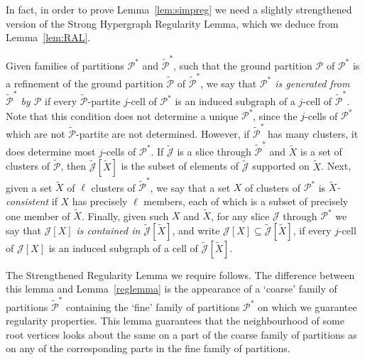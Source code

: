 \documentclass[12pt,a4paper]{amsart}
\newcommand{\cJ}{\mathcal{J}}
\newcommand{\Part}{\mathcal{P}}
\begin{document}
In fact, in order to prove Lemma~\ref{lem:simpreg} we need a slightly
strengthened version of the Strong Hypergraph Regularity Lemma, which we deduce from Lemma~\ref{lem:RAL}. 

Given families of partitions $\Part^*$ and $\tilde{\Part}^*$, such that the ground partition $\Part$ of $\Part^*$ is a refinement of the ground partition $\tilde{\Part}$ of $\tilde{\Part}^*$, we say that \emph{$\Part^*$ is generated from
$\tilde{\Part}^*$ by $\Part$} if every $\tilde{\Part}$-partite $j$-cell of $\Part^*$ is an
induced subgraph of a $j$-cell of $\tilde{\Part}^*$. Note that this condition does not determine a unique $\Part^*$, since the $j$-cells of $\Part^*$ which are not $\tilde{\Part}$-partite are not determined. However, if $\tilde{\Part}^*$ has many clusters, it does determine most $j$-cells of $\Part^*$. If $\tilde{\cJ}$ is a slice through $\tilde{\Part}^*$ and $\tilde{X}$ is a
set of clusters of $\tilde{\Part}$, then $\tilde{\cJ}[\tilde{X}]$ is the subset of elements of
$\tilde{\cJ}$ supported on $\tilde{X}$. Next, given a set $\tilde{X}$ of $\ell$ clusters of $\tilde{\Part}^*$, we say that a set $X$ of clusters of $\Part^*$ is \emph{$\tilde{X}$-consistent} if $X$ has precisely $\ell$ members, each of which is a subset of precisely one member of $\tilde{X}$. Finally, given such $X$ and $\tilde{X}$, for any slice $\cJ$ through $\Part^*$ we say that \emph{$\cJ[X]$
is contained in $\tilde{\cJ}[\tilde{X}]$}, and write $\cJ[X]\subseteq \tilde{\cJ}[\tilde{X}]$, if every
$j$-cell of $\cJ[X]$ is an induced subgraph of a cell of
$\tilde{\cJ}[\tilde{X}]$.

The Strengthened Regularity Lemma we require follows. The difference between this lemma and Lemma~\ref{reglemma} is the appearance
of a `coarse' family of partitions $\tilde{\Part}^*$ containing the `fine' family of partitions $\Part^*$
on which we guarantee regularity properties. This lemma guarantees that the neighbourhood of
some root vertices looks about the same on a part of
the coarse family of partitions as on any of the corresponding parts in the fine family of partitions.
\end{document}
